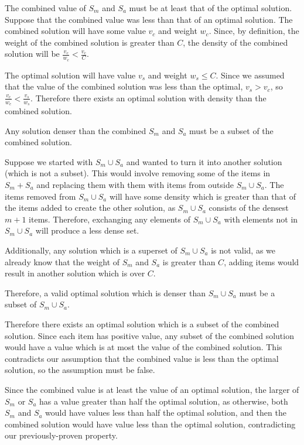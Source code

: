 \documentclass[11pt]{article}
\begin{document}
The combined value of $S_m$ and $S_a$ must be at least that of the optimal solution. Suppose that the combined value was less than that of an optimal solution. The combined solution will have some value $v_c$ and weight $w_c$. Since, by definition, the weight of the combined solution is greater than $C$, the density of the combined solution will be $\frac{v_c}{w_c} < \frac{v_c}{C}$. 

The optimal solution will have value $v_s$ and weight $w_s \leq C$. Since we assumed that the value of the combined solution was less than the optimal, $v_s > v_c$, so $\frac{v_c}{w_c} < \frac{v_s}{w_s}$. Therefore there exists an optimal solution with density than the combined solution.

Any solution denser than the combined $S_m$ and $S_a$ must be a subset of the combined solution.

Suppose we started with $S_m \cup S_a$ and wanted to turn it into another solution (which is not a subset). This would involve removing some of the items in $S_m + S_a$ and replacing them with them with items from outside $S_m \cup S_a$. The items removed from $S_m \cup S_a$ will have some density which is greater than that of the items added to create the other solution, as $S_m \cup S_a$ consists of the densest $m+1$ items. Therefore, exchanging any elements of $S_m \cup S_a$ with elements not in $S_m \cup S_a$ will produce a less dense set.

Additionally, any solution which is a superset of $S_m \cup S_a$ is not valid, as we already know that the weight of $S_m$ and $S_a$ is greater than $C$, adding items would result in another solution which is over $C$.

Therefore, a valid optimal solution which is denser than $S_m \cup S_a$ must be a subset of $S_m \cup S_a$.

Therefore there exists an optimal solution which is a subset of the combined solution. Since each item has positive value, any subset of the combined solution would have a value which is at most the value of the combined solution. This contradicts our assumption that the combined value is less than the optimal solution, so the assumption must be false.

Since the combined value is at least the value of an optimal solution, the larger of $S_m$ or $S_a$ has a value greater than half the optimal solution, as otherwise, both $S_m$ and $S_a$ would have values less than half the optimal solution, and then the combined solution would have value less than the optimal solution, contradicting our previously-proven property.
\end{document}
